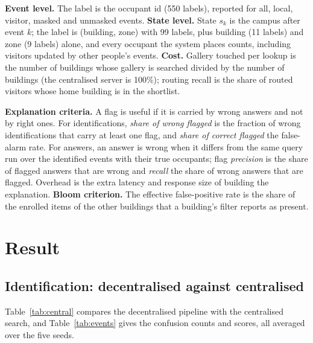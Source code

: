 \documentclass[12pt,a4paper,oneside]{report}
\begin{document}
\textbf{Event level.} The label is the occupant id (550 labels), reported for all, local, visitor, masked and unmasked events. \textbf{State level.} State $s_k$ is the campus after event $k$; the label is (building, zone) with 99 labels, plus building (11 labels) and zone (9 labels) alone, and every occupant the system places counts, including visitors updated by other people's events. \textbf{Cost.} Gallery touched per lookup is the number of buildings whose gallery is searched divided by the number of buildings (the centralised server is 100\%); routing recall is the share of routed visitors whose home building is in the shortlist.

\textbf{Explanation criteria.} A flag is useful if it is carried by wrong answers and not by right ones. For identifications, \emph{share of wrong flagged} is the fraction of wrong identifications that carry at least one flag, and \emph{share of correct flagged} the false-alarm rate. For answers, an answer is wrong when it differs from the same query run over the identified events with their true occupants; flag \emph{precision} is the share of flagged answers that are wrong and \emph{recall} the share of wrong answers that are flagged. Overhead is the extra latency and response size of building the explanation. \textbf{Bloom criterion.} The effective false-positive rate is the share of the enrolled items of the other buildings that a building's filter reports as present.

\section{Result}
\subsection{Identification: decentralised against centralised}\label{sec:res-events}
Table~\ref{tab:central} compares the decentralised pipeline with the centralised search, and Table~\ref{tab:events} gives the confusion counts and scores, all averaged over the five seeds.
\end{document}

